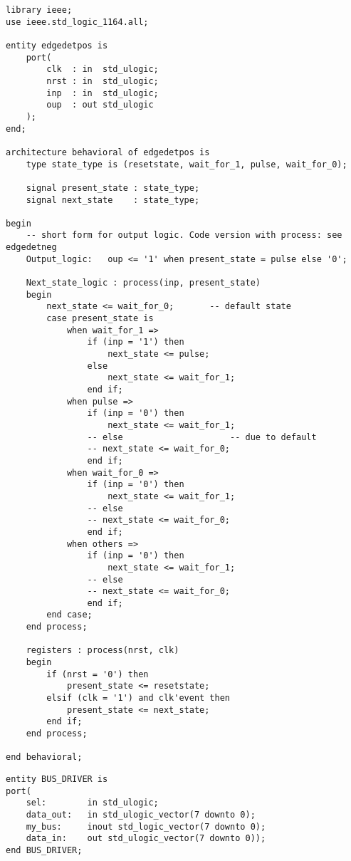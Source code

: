 \begin{minipage}{0.01\textwidth}
	\text{ } %
\end{minipage}
\begin{minipage}{0.48\textwidth}
	\begin{lstlisting}
library ieee;
use ieee.std_logic_1164.all;

entity edgedetpos is
	port(
		clk  : in  std_ulogic;
		nrst : in  std_ulogic;
		inp  : in  std_ulogic;
		oup  : out std_ulogic
	);
end;

architecture behavioral of edgedetpos is
	type state_type is (resetstate, wait_for_1, pulse, wait_for_0);

	signal present_state : state_type;
	signal next_state    : state_type;

begin
	-- short form for output logic. Code version with process: see edgedetneg
	Output_logic:	oup <= '1' when present_state = pulse else '0';

	Next_state_logic : process(inp, present_state)
	begin
		next_state <= wait_for_0;       -- default state
		case present_state is
			when wait_for_1 =>
				if (inp = '1') then
					next_state <= pulse;
				else
					next_state <= wait_for_1;
				end if;
			when pulse =>
				if (inp = '0') then
					next_state <= wait_for_1;
				-- else						-- due to default
				-- next_state <= wait_for_0;
				end if;
			when wait_for_0 =>
				if (inp = '0') then
					next_state <= wait_for_1;
				-- else
				-- next_state <= wait_for_0;
				end if;
			when others =>
				if (inp = '0') then
					next_state <= wait_for_1;
				-- else
				-- next_state <= wait_for_0;
				end if;
		end case;
	end process;

	registers : process(nrst, clk)
	begin
		if (nrst = '0') then
			present_state <= resetstate;
		elsif (clk = '1') and clk'event then
			present_state <= next_state;
		end if;
	end process;

end behavioral;
	\end{lstlisting}
	\begin{lstlisting}
entity BUS_DRIVER is
port(
	sel: 		in std_ulogic;
	data_out: 	in std_ulogic_vector(7 downto 0);
	my_bus: 	inout std_logic_vector(7 downto 0);
	data_in: 	out std_ulogic_vector(7 downto 0));
end BUS_DRIVER;
	\end{lstlisting}
\end{minipage}
\begin{minipage}{0.02\textwidth}
	\text{ } %
\end{minipage}
